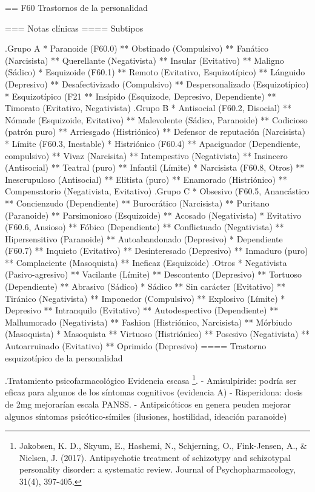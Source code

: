 \documentclass[encares.tex]{subfiles}
\begin{document}
== F60 Trastornos de la personalidad

=== Notas clínicas
==== Subtipos

.Grupo A
* Paranoide (F60.0)
** Obstinado (Compulsivo)
** Fanático (Narcisista)
** Querellante (Negativista)
** Insular (Evitativo)
** Maligno (Sádico)
* Esquizoide (F60.1)
** Remoto (Evitativo, Esquizotípico)
** Lánguido (Depresivo)
** Desafectivizado (Compulsivo)
** Despersonalizado (Esquizotípico)
* Esquizotípico (F21
** Insípido (Esquizode, Depresivo, Dependiente)
** Timorato (Evitativo, Negativista)
.Grupo B
* Antisocial (F60.2, Disocial)
** Nómade (Esquizoide, Evitativo)
** Malevolente (Sádico, Paranoide)
** Codicioso (patrón puro)
** Arriesgado (Histriónico)
** Defensor de reputación (Narcisista)
* Límite (F60.3, Inestable)
* Histriónico (F60.4)
** Apaciguador (Dependiente, compulsivo)
** Vivaz (Narcisita)
** Intempestivo (Negativista)
** Insincero (Antisocial)
** Teatral (puro)
** Infantil (Límite)
* Narcisista (F60.8, Otros)
** Inescrupuloso (Antisocial)
** Elitista (puro)
** Enamorado (Histriónico)
** Compensatorio (Negativista, Evitativo)
.Grupo C
* Obsesivo (F60.5, Anancástico
** Concienzudo (Dependiente)
** Burocrático (Narcisista)
** Puritano (Paranoide)
** Parsimonioso (Esquizoide)
** Acosado (Negativista)
* Evitativo (F60.6, Ansioso)
** Fóbico (Dependiente)
** Conflictuado (Negativista)
** Hipersensitivo (Paranoide)
** Autoabandonado (Depresivo)
* Dependiente (F60.7)
** Inquieto (Evitativo)
** Desinteresado (Depresivo)
** Inmaduro (puro)
** Complaciente (Masoquista)
** Ineficaz (Esquizoide)
.Otros
* Negativista (Pasivo-agresivo)
** Vacilante (Límite)
** Descontento (Depresivo)
** Tortuoso (Dependiente)
** Abrasivo (Sádico)
* Sádico
** Sin carácter (Evitativo)
** Tiránico (Negativista)
** Imponedor (Compulsivo)
** Explosivo (Límite)
* Depresivo
** Intranquilo (Evitativo)
** Autodespectivo (Dependiente)
** Malhumorado (Negativista)
** Fashion (Histriónico, Narcisista)
** Mórbiudo (Masoquista)
* Masoquista
** Virtuoso (Histriónico)
** Posesivo (Negativista)
** Autoarruinado (Evitativo)
** Oprimido (Depresivo)
==== Trastorno esquizotípico de la personalidad

.Tratamiento psicofarmacológico
Evidencia escasa \footnote{Jakobsen, K. D., Skyum, E., Hashemi, N., Schjerning, O., Fink-Jensen, A., \& Nielsen, J. (2017). Antipsychotic treatment of schizotypy and schizotypal personality disorder: a systematic review. Journal of Psychopharmacology, 31(4), 397-405.}.
- Amisulpiride: podría ser eficaz para algunos de los síntomas cognitivos (evidencia A)
- Risperidona: dosis de 2mg mejorarían escala PANSS.
- Antipsicóticos en genera peuden mejorar algunos síntomas psicótico-símiles (ilusiones, hostilidad, ideación paranoide)
\end{document}
